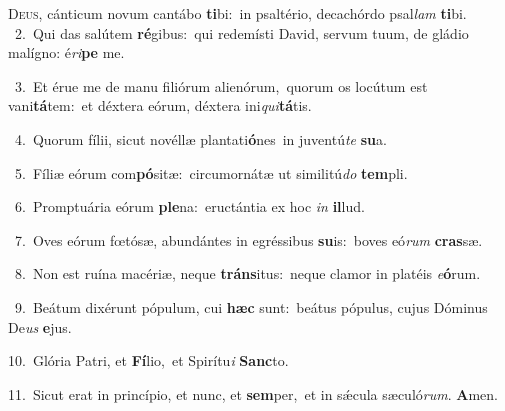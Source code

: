 \lettrine{\initial\textcolor{\initialcolor}{D}}{eus,} cánticum novum cantábo \textbf{ti}\-bi:~\star in psaltério, decachórdo psal\textit{lam} \textbf{ti}\-bi.\\
{\numbfont\textcolor{\numbcolor}{~2.}}~Qui das salútem \textbf{ré}\-gibus:~\star qui redemísti David, servum tuum, de gládio malígno: é\-\textit{ri}\-\textbf{pe} me.\par
{\numbfont\textcolor{\numbcolor}{~3.}}~Et érue me de manu filiórum alienórum,~\dagger quorum os locútum est vani\-\textbf{tá}\-tem:~\star et déxtera eórum, déxtera ini\-\textit{qui}\-\textbf{tá}tis.\par
{\numbfont\textcolor{\numbcolor}{~4.}}~Quorum fílii, sicut novéllæ plantati\-\textbf{ó}\-nes~\star in juventú\textit{te} \textbf{su}\-a.\par
{\numbfont\textcolor{\numbcolor}{~5.}}~Fíliæ eórum com\-\textbf{pó}\-sitæ:~\star circumornátæ ut similitú\textit{do} \textbf{tem}\-pli.\par
{\numbfont\textcolor{\numbcolor}{~6.}}~Promptuária eórum \textbf{ple}\-na:~\star eructántia ex hoc \textit{in} \textbf{il}\-lud.\par
{\numbfont\textcolor{\numbcolor}{~7.}}~Oves eórum fœtósæ, abundántes in egréssibus \textbf{su}\-is:~\star boves eó\textit{rum} \textbf{cras}\-sæ.\par
{\numbfont\textcolor{\numbcolor}{~8.}}~Non est ruína macériæ, neque \textbf{tráns}\-itus:~\star neque clamor in platéis \textit{e}\-\textbf{ó}rum.\par
{\numbfont\textcolor{\numbcolor}{~9.}}~Beátum dixérunt pópulum, cui \textbf{hæc} sunt:~\star beátus pópulus, cujus Dóminus De\textit{us} \textbf{e}\-jus.\par
{\numbfont\textcolor{\numbcolor}{10.}}~Glória Patri, et \textbf{Fí}\-lio,~\star et Spirítu\textit{i} \textbf{Sanc}\-to.\par
{\numbfont\textcolor{\numbcolor}{11.}}~Sicut erat in princípio, et nunc, et \textbf{sem}\-per,~\star et in sǽcula sæculó\-\textit{rum}\-. \textbf{A}\-men.\par
